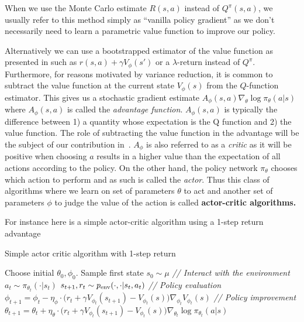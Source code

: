 When we use the Monte Carlo estimate $R(s, a)$ instead of $Q^\pi(s,a)$, we usually refer to this method simply as ``vanilla policy gradient'' as we don't necessarily need to learn a parametric value function to improve our policy. 

Alternatively we can use a bootstrapped estimator of the value function as presented in  such as $r(s,a) + \gamma V_\phi(s')$ or a $\lambda$-return instead of $Q^\pi$. Furthermore, for reasons motivated by variance reduction, it is common to subtract the value function at the current state $V_\phi(s)$ from the $Q$-function estimator. This gives us a stochastic gradient estimate $A_{\phi}(s,a) \nabla_\theta \log \pi_\theta(a|s)$ where $A_\phi(s,a)$ is called the \emph{advantage function}. $A_\phi(s,a)$ is typically the difference between 1) a quantity whose expectation is the Q function and 2) the value function. The role of subtracting the value function in the advantage will be the subject of our contribution in~. $A_\phi$ is also referred to as a \emph{critic} as it will be positive when choosing $a$ results in a higher value than the expectation of all actions according to the policy. On the other hand, the policy network $\pi_\theta$ chooses which action to perform and as such is called the \emph{actor}. Thus this class of algorithms where we learn on set of parameters $\theta$ to act and another set of parameters $\phi$ to judge the value of the action is called \textbf{actor-critic algorithms.} 

For instance here is a simple actor-critic algorithm using a 1-step return advantage

\begin{center}
\begin{minipage}{0.9\textwidth}
\begin{algorithm}[H]
\caption{Simple actor critic algorithm with 1-step return}
\label{alg:ac_methods}
\begin{algorithmic}[1]
\STATE Choose initial $\theta_0, \phi_0$.
\STATE Sample first state $s_0 \sim \mu$
\STATE \textit{// Interact with the environment}
\STATE $a_t \sim \pi_{\theta_t}(\cdot | s_t)$
\STATE $s_{t+1}, r_t \sim p_{\text{env}}(\cdot, \cdot | s_t, a_t)$
\STATE \textit{// Policy evaluation}
\STATE $\phi_{t+1} = \phi_t - \eta_\phi \cdot \big(r_t + \gamma V_{\phi_t}(s_{t+1}) - V_{\phi_t}(s)\big) \nabla_{\phi_t}V_{\phi_t}(s) $
\STATE \textit{// Policy improvement}
\STATE $\theta_{t+1} = \theta_t + \eta_\theta \cdot \big( r_t + \gamma V_{\phi_t}(s_{t+1}) - V_{\phi_t}(s)\big) \nabla_{\theta_t} \log \pi_{\theta_t}(a|s)$ 
\ENDFOR
\end{algorithmic}
\end{algorithm}
\end{minipage}
\end{center}
\vspace{1em}

